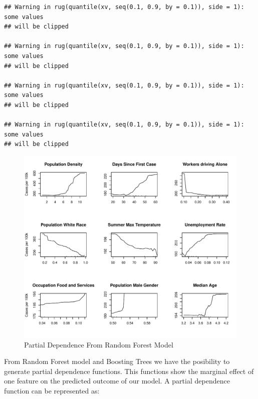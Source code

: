\documentclass[
]{article}
\begin{document}
\begin{verbatim}
## Warning in rug(quantile(xv, seq(0.1, 0.9, by = 0.1)), side = 1): some values
## will be clipped

## Warning in rug(quantile(xv, seq(0.1, 0.9, by = 0.1)), side = 1): some values
## will be clipped

## Warning in rug(quantile(xv, seq(0.1, 0.9, by = 0.1)), side = 1): some values
## will be clipped

## Warning in rug(quantile(xv, seq(0.1, 0.9, by = 0.1)), side = 1): some values
## will be clipped
\end{verbatim}

\begin{figure}
\centering
\includegraphics{covid_tree_analysis_files/figure-latex/fig1-1.pdf}
\caption{Partial Dependence From Random Forest Model}
\end{figure}

From Random Forest model and Boosting Trees we have the posibility to
generate partial dependence functions. This functions show the marginal
effect of one feature on the predicted outcome of our model. A partial
dependence function can be represented as:
\end{document}
